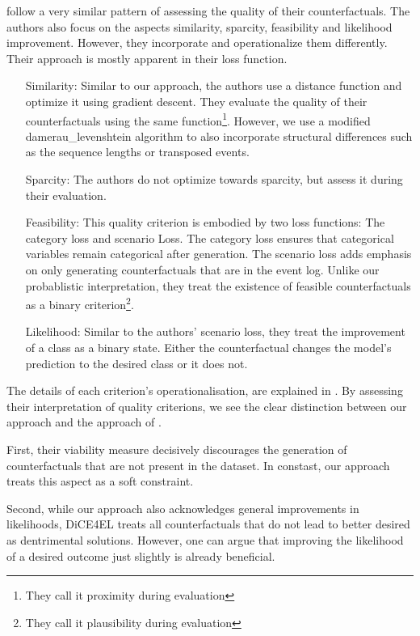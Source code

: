 \documentclass[./../../paper.tex]{subfiles}
\begin{document}
\citeauthor{hsieh_DiCE4ELInterpretingProcess_2021} follow a very similar pattern of assessing the quality of their counterfactuals. The authors also focus on the aspects similarity, sparcity, feasibility and likelihood improvement. However, they incorporate and operationalize them differently. Their approach is mostly apparent in their loss function.

\begin{itemize}
    \item[Similarity:] Similar to our approach, the authors use a distance function and optimize it using gradient descent. They evaluate the quality of their counterfactuals using the same function\footnote{They call it proximity during evaluation}. However, we use a modified \gls{damerau_levenshtein} algorithm to also incorporate structural differences such as the sequence lengths or transposed events.      
    \item[Sparcity:] The authors do not optimize towards sparcity, but assess it during their evaluation. 
    \item[Feasibility:] This quality criterion is embodied by two loss functions: The category loss and scenario Loss. The category loss ensures that categorical variables remain categorical after generation. The scenario loss adds emphasis on only generating counterfactuals that are in the event log. Unlike our probablistic interpretation, they treat the existence of feasible counterfactuals as a binary criterion\footnote{They call it plausibility during evaluation}.   
    \item[Likelihood:] Similar to the authors' scenario loss, they treat the improvement of a class as a binary state. Either the counterfactual changes the model's prediction to the desired class or it does not.
\end{itemize}

The details of each criterion's operationalisation, are explained in \autocite{hsieh_DiCE4ELInterpretingProcess_2021}. By assessing their interpretation of quality criterions, we see the clear distinction between our approach and the approach of \citeauthor{hsieh_DiCE4ELInterpretingProcess_2021}. 

First, their viability measure decisively discourages the generation of counterfactuals that are not present in the dataset. In constast, our approach treats this aspect as a soft constraint. 

Second, while our approach also acknowledges general improvements in likelihoods, DiCE4EL treats all counterfactuals that do not lead to better desired as dentrimental solutions. However, one can argue that improving the likelihood of a desired outcome just slightly is already beneficial.
\end{document}
